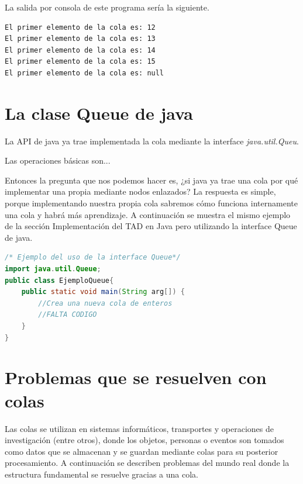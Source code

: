 La salida por consola de este programa sería la siguiente.

\begin{lstlisting}[numbers=none]
El primer elemento de la cola es: 12
El primer elemento de la cola es: 13
El primer elemento de la cola es: 14
El primer elemento de la cola es: 15
El primer elemento de la cola es: null
\end{lstlisting}

\section{La clase Queue de java}
La API de java ya trae implementada la cola mediante la interface \textit{java.util.Queu}. 

Las operaciones básicas son...

Entonces la pregunta que nos podemos hacer es, ¿si java ya trae una cola por qué implementar una propia mediante nodos enlazados? La respuesta es simple, porque implementando nuestra propia cola sabremos cómo funciona internamente una cola y habrá más aprendizaje. A continuación se muestra el mismo ejemplo de la sección Implementación del TAD en Java pero utilizando la interface Queue de java.

\begin{lstlisting}[language=Java]
/* Ejemplo del uso de la interface Queue*/
import java.util.Queue;
public class EjemploQueue{
    public static void main(String arg[]) {
        //Crea una nueva cola de enteros
        //FALTA CODIGO
    }
}
\end{lstlisting}


\section{Problemas que se resuelven con colas}
Las colas se utilizan en sistemas informáticos, transportes y operaciones de investigación (entre otros), donde los objetos, personas o eventos son tomados como datos que se almacenan y se guardan mediante colas para su posterior procesamiento. A continuación se describen problemas del mundo real donde la estructura fundamental se resuelve gracias a una cola.


